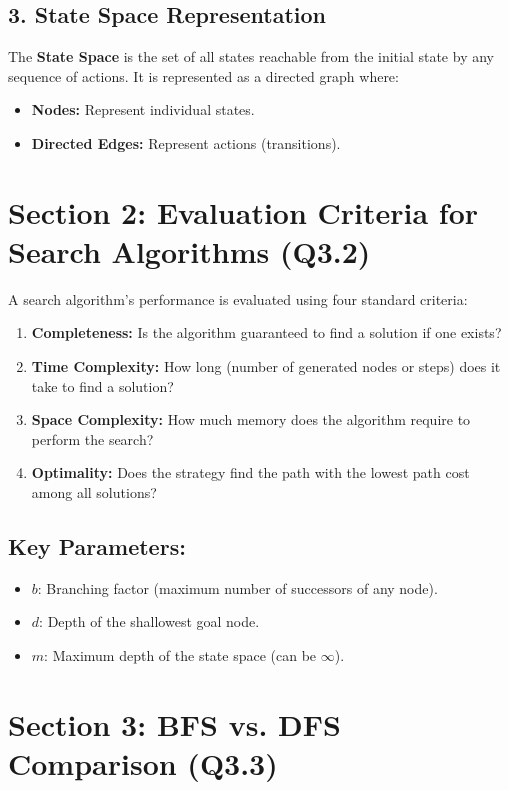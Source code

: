 \subsection{3. State Space Representation}
The \textbf{State Space} is the set of all states reachable from the initial state by any sequence of actions. It is represented as a directed graph where:
\begin{itemize}
  \item   \textbf{Nodes:} Represent individual states.
  \item   \textbf{Directed Edges:} Represent actions (transitions).
\end{itemize}


\section{Section 2: Evaluation Criteria for Search Algorithms (Q3.2)}

A search algorithm's performance is evaluated using four standard criteria:

\begin{enumerate}
  \item \textbf{Completeness:} Is the algorithm guaranteed to find a solution if one exists?
  \item \textbf{Time Complexity:} How long (number of generated nodes or steps) does it take to find a solution?
  \item \textbf{Space Complexity:} How much memory does the algorithm require to perform the search?
  \item \textbf{Optimality:} Does the strategy find the path with the lowest path cost among all solutions?
\end{enumerate}

\subsection{Key Parameters:}
\begin{itemize}
  \item   $b$: Branching factor (maximum number of successors of any node).
  \item   $d$: Depth of the shallowest goal node.
  \item   $m$: Maximum depth of the state space (can be $\infty$).
\end{itemize}


\section{Section 3: BFS vs. DFS Comparison (Q3.3)}


